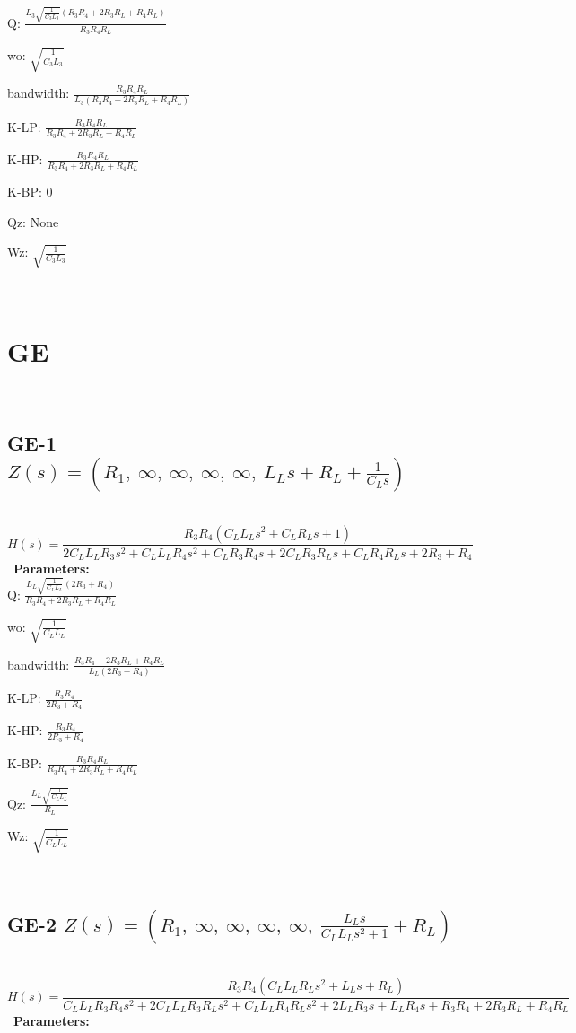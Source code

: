 \documentclass{article}
\begin{document}
Q: $\frac{L_{3} \sqrt{\frac{1}{C_{3} L_{3}}} \left(R_{3} R_{4} + 2 R_{3} R_{L} + R_{4} R_{L}\right)}{R_{3} R_{4} R_{L}}$\ 

wo: $\sqrt{\frac{1}{C_{3} L_{3}}}$\ 

bandwidth: $\frac{R_{3} R_{4} R_{L}}{L_{3} \left(R_{3} R_{4} + 2 R_{3} R_{L} + R_{4} R_{L}\right)}$\ 

K-LP: $\frac{R_{3} R_{4} R_{L}}{R_{3} R_{4} + 2 R_{3} R_{L} + R_{4} R_{L}}$\ 

K-HP: $\frac{R_{3} R_{4} R_{L}}{R_{3} R_{4} + 2 R_{3} R_{L} + R_{4} R_{L}}$\ 

K-BP: $0$\ 

Qz: $\text{None}$\ 

Wz: $\sqrt{\frac{1}{C_{3} L_{3}}}$\ 

\ 

\section{GE}\ 
\subsection{GE-1 $Z(s) = \left( R_{1}, \  \infty, \  \infty, \  \infty, \  \infty, \  L_{L} s + R_{L} + \frac{1}{C_{L} s}\right)$ } \ 
\textbf{\[H(s) = \frac{R_{3} R_{4} \left(C_{L} L_{L} s^{2} + C_{L} R_{L} s + 1\right)}{2 C_{L} L_{L} R_{3} s^{2} + C_{L} L_{L} R_{4} s^{2} + C_{L} R_{3} R_{4} s + 2 C_{L} R_{3} R_{L} s + C_{L} R_{4} R_{L} s + 2 R_{3} + R_{4}}\] } \ 
\textbf{Parameters:}\\ 

Q: $\frac{L_{L} \sqrt{\frac{1}{C_{L} L_{L}}} \left(2 R_{3} + R_{4}\right)}{R_{3} R_{4} + 2 R_{3} R_{L} + R_{4} R_{L}}$\ 

wo: $\sqrt{\frac{1}{C_{L} L_{L}}}$\ 

bandwidth: $\frac{R_{3} R_{4} + 2 R_{3} R_{L} + R_{4} R_{L}}{L_{L} \left(2 R_{3} + R_{4}\right)}$\ 

K-LP: $\frac{R_{3} R_{4}}{2 R_{3} + R_{4}}$\ 

K-HP: $\frac{R_{3} R_{4}}{2 R_{3} + R_{4}}$\ 

K-BP: $\frac{R_{3} R_{4} R_{L}}{R_{3} R_{4} + 2 R_{3} R_{L} + R_{4} R_{L}}$\ 

Qz: $\frac{L_{L} \sqrt{\frac{1}{C_{L} L_{L}}}}{R_{L}}$\ 

Wz: $\sqrt{\frac{1}{C_{L} L_{L}}}$\ 

\ 

\subsection{GE-2 $Z(s) = \left( R_{1}, \  \infty, \  \infty, \  \infty, \  \infty, \  \frac{L_{L} s}{C_{L} L_{L} s^{2} + 1} + R_{L}\right)$ } \ 
\textbf{\[H(s) = \frac{R_{3} R_{4} \left(C_{L} L_{L} R_{L} s^{2} + L_{L} s + R_{L}\right)}{C_{L} L_{L} R_{3} R_{4} s^{2} + 2 C_{L} L_{L} R_{3} R_{L} s^{2} + C_{L} L_{L} R_{4} R_{L} s^{2} + 2 L_{L} R_{3} s + L_{L} R_{4} s + R_{3} R_{4} + 2 R_{3} R_{L} + R_{4} R_{L}}\] } \ 
\textbf{Parameters:}\\ 
\end{document}
